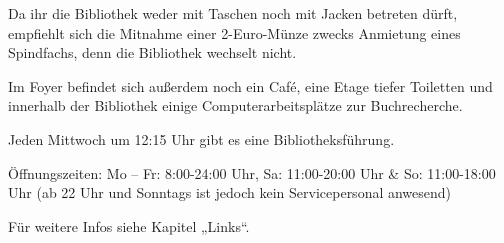 Da ihr die Bibliothek weder mit Taschen noch mit Jacken betreten dürft, empfiehlt sich die Mitnahme einer 2-Euro-Münze zwecks Anmietung eines Spindfachs, denn die Bibliothek wechselt nicht.

Im Foyer befindet sich außerdem noch ein Café, eine Etage tiefer Toiletten und innerhalb der Bibliothek einige Computerarbeitsplätze zur Buchrecherche.

Jeden Mittwoch um 12:15 Uhr gibt es eine Bibliotheksführung. 

Öffnungszeiten: Mo – Fr: 8:00-24:00 Uhr, Sa: 11:00-20:00 Uhr & So: 11:00-18:00 Uhr (ab 22 Uhr und Sonntags ist jedoch kein Servicepersonal anwesend)

Für weitere Infos siehe Kapitel „Links“.